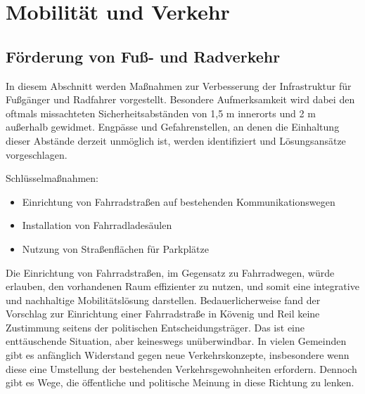 \section{Mobilität und Verkehr}
\subsection{Förderung von Fuß- und Radverkehr}

In diesem Abschnitt werden Maßnahmen zur Verbesserung der Infrastruktur für Fußgänger und Radfahrer vorgestellt. Besondere Aufmerksamkeit wird dabei den oftmals missachteten Sicherheitsabständen von 1,5 m innerorts und 2 m außerhalb gewidmet. Engpässe und Gefahrenstellen, an denen die Einhaltung dieser Abstände derzeit unmöglich ist, werden identifiziert und Lösungsansätze vorgeschlagen.

Schlüsselmaßnahmen:
\begin{itemize}
\item Einrichtung von Fahrradstraßen auf bestehenden Kommunikationswegen
\item Installation von Fahrradladesäulen
\item Nutzung von Straßenflächen für Parkplätze
\end{itemize}

Die Einrichtung von Fahrradstraßen, im Gegensatz zu Fahrradwegen,  würde erlauben, den vorhandenen Raum effizienter zu nutzen, und somit eine integrative und nachhaltige Mobilitätslösung darstellen. Bedauerlicherweise fand der Vorschlag zur Einrichtung einer Fahrradstraße in Kövenig und Reil keine Zustimmung seitens der politischen Entscheidungsträger. Das ist eine enttäuschende Situation, aber keineswegs unüberwindbar. In vielen Gemeinden gibt es anfänglich Widerstand gegen neue Verkehrskonzepte, insbesondere wenn diese eine Umstellung der bestehenden Verkehrsgewohnheiten erfordern. Dennoch gibt es Wege, die öffentliche und politische Meinung in diese Richtung zu lenken.

